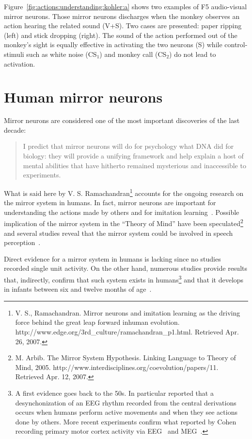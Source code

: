 Figure~\ref{fig:actions:understanding:kohler:a} shows two examples of
F5 audio-visual mirror neurons.
Those mirror neurons discharges when the monkey observes
an action hearing the related sound (V+S). 
Two cases are presented: paper ripping (left) and stick dropping (right).
The sound of the action performed out of the monkey's sight is equally
effective in activating the two neurons (S) while control-stimuli such as white 
noise (CS$_1$) and monkey call (CS$_2$) do not lead to activation.

\section{Human mirror neurons}
\label{sec:actions:human}
Mirror neurons are considered one of the most important discoveries of the
last decade:
\begin{quote}
I predict that mirror neurons will do for psychology what DNA did for biology:
they will provide a unifying framework and help explain a host of mental 
abilities that have hitherto remained mysterious and inaccessible to 
experiments.
\end{quote}
What is said here by V. S. Ramachandran\footnote{V. S., Ramachandran. 
Mirror neurons and imitation learning as the driving force behind the 
great leap forward inhuman evolution.
http://www.edge.org/3rd\_culture/ramachandran\_p1.html.
Retrieved Apr. 26, 2007.} 
accounts for the ongoing research on the mirror system in humans.
In fact, mirror neurons are important for understanding the actions made by
others and for imitation learning~\citep{rizzolatti.craighero:2004}.
Possible implication of the mirror system in the ``Theory of Mind''
have been speculated\footnote{M. Arbib. The Mirror System Hypothesis.
Linking Language to Theory of Mind, 2005. http://www.interdisciplines.org/coevolution/papers/11. Retrieved Apr. 12, 2007.}
and several studies reveal that the mirror system could be involved in speech 
perception~\citep{rizzolatti.arbib:1998,fadiga.etal:PRESS}. 

Direct evidence for a mirror system in humans is lacking since no studies
recorded single unit activity.
On the other hand, numerous studies provide results that, indirectly, confirm 
that such system exists in humans\footnote{A first evidence goes back to the
50s. In particular
\citet{cohen-seat.etal:1954} reported that a desynchonization of an EEG rhythm 
recorded from the central derivations occurs when humans perform active
movements and when they see actions done by others.
More recent experiments confirm what reported by Cohen recording primary motor
cortex activity via EEG~\citep{cochin.etal:1998,cochin.etal:1999} and 
MEG~\citep{hari.etal:1998}.} and that it develops in infants between six and
twelve months of age~\citep{falck-ytter.etal:2006}.

